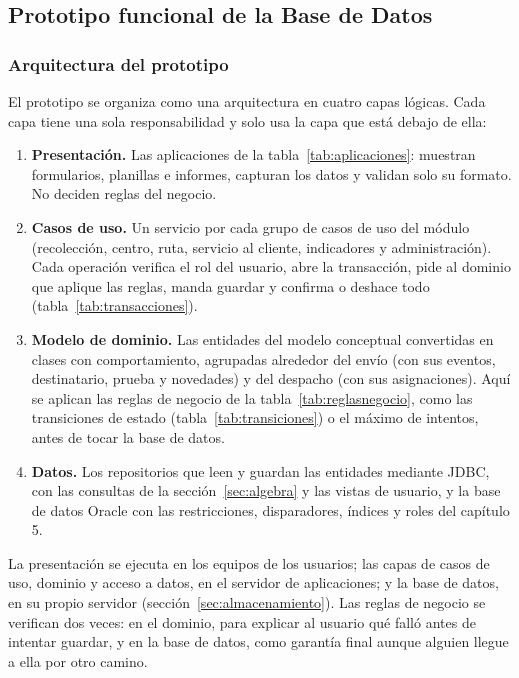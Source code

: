 \subsection{Prototipo funcional de la Base de Datos}
\label{sec:prototipo}

\subsubsection{Arquitectura del prototipo}
\label{sec:arquitectura}

El prototipo se organiza como una arquitectura en cuatro capas lógicas.
Cada capa tiene una sola responsabilidad y solo usa la capa que está
debajo de ella:

\begin{enumerate}[itemsep=2pt]
  \item \textbf{Presentación.} Las aplicaciones de la
        tabla~\ref{tab:aplicaciones}: muestran formularios, planillas e
        informes, capturan los datos y validan solo su formato. No
        deciden reglas del negocio.
  \item \textbf{Casos de uso.} Un servicio por cada grupo de casos de
        uso del módulo (recolección, centro, ruta, servicio al cliente,
        indicadores y administración). Cada operación verifica el rol
        del usuario, abre la transacción, pide al dominio que aplique las
        reglas, manda guardar y confirma o deshace todo
        (tabla~\ref{tab:transacciones}).
  \item \textbf{Modelo de dominio.} Las entidades del modelo conceptual
        convertidas en clases con comportamiento, agrupadas alrededor
        del envío (con sus eventos, destinatario, prueba y novedades) y
        del despacho (con sus asignaciones). Aquí se aplican las reglas
        de negocio de la tabla~\ref{tab:reglasnegocio}, como las
        transiciones de estado (tabla~\ref{tab:transiciones}) o el
        máximo de intentos, antes de tocar la base de datos.
  \item \textbf{Datos.} Los repositorios que leen y guardan las entidades
        mediante JDBC, con las consultas de la sección~\ref{sec:algebra}
        y las vistas de usuario, y la base de datos Oracle con las
        restricciones, disparadores, índices y roles del capítulo 5.
\end{enumerate}

La presentación se ejecuta en los equipos de los usuarios; las capas de
casos de uso, dominio y acceso a datos, en el servidor de aplicaciones;
y la base de datos, en su propio servidor (sección~\ref{sec:almacenamiento}).
Las reglas de negocio se verifican dos veces: en el dominio, para
explicar al usuario qué falló antes de intentar guardar, y en la base de
datos, como garantía final aunque alguien llegue a ella por otro camino.

